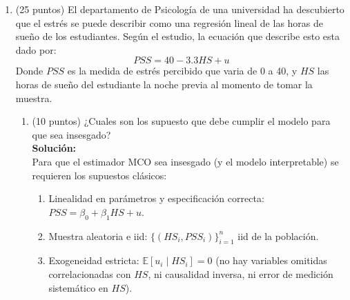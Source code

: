 \documentclass[10pt,a4paper]{article}
\begin{document}
\begin{enumerate}
\begin{enumerate}
    \item (10 puntos) Demuestre que este efecto de atenuación \textbf{no} proviene del error de medición en $Y$.
    \\
    \textbf{Solución}: Tenemos 2 formas, la primera es ver que el efecto de atenuación solo depende de $\sigma_w^2$ y no de $\sigma^2_u$ que es la varianza del error de medición de $Y$.
    La segunda forma es demostrar que solo con error de medición en $X$ se llega al mismo resultado, por lo que el error de medición en $Y$ es indiferente para el valor del estimador. Para esto:
    $$\beta^*_1 = \frac{Cov(Y,X^*)}{Var(X^*)} = \frac{Cov(Y,X+w)}{Var(X+w)}=\frac{Cov(Y,X)+Cov(Y,w)}{Var(X+w)}$$
    Como  $Cov(Y,w)=0$, entonces:
    $$\beta^*_1=\frac{Cov(X,Y)}{Var(X+w)}$$
    Ahora sustituyendo $Y= \beta_0 + \beta_1 \, X +\epsilon$ tenemos:
    $$\beta^*_1=\frac{Cov(X,\beta_0 + \beta_1 \, X+\epsilon)}{Var(X+w)}$$
    distribuyendo, y eliminando covarianzas que son igual a 0:
    $$\beta^*_1=\beta_1\frac{Cov(X,X)}{Var(X+w)}$$
    $$\beta^*_1=\beta_1\frac{Var(X)}{Var(X) + \sigma^2_w}$$
    Como se llega al mismo valor con error de medición en $Y$ y $X$, que con solo $X$ con error de medición, esto indica que el error en Y no afecta a la atenuación y el sesgo.
\end{enumerate}




\item (25 puntos) El departamento de Psicología de una universidad ha descubierto que el estrés se puede describir como una regresión lineal de las horas de sueño de los estudiantes. Según el estudio, la ecuación que describe esto esta dado por:
$$PSS=40 - 3.3HS + u$$
Donde $PSS$ es la medida de estrés percibido que varia de 0 a 40, y $HS$ las horas de sueño del estudiante la noche previa al momento de tomar la muestra. 

\begin{enumerate}
    \item (10 puntos) ¿Cuales son los supuesto que debe cumplir el modelo para que sea insesgado?
        \\
        \textbf{Solución:}\\
        Para que el estimador MCO sea insesgado (y el modelo interpretable) se requieren los supuestos clásicos:
\begin{enumerate}
\item Linealidad en parámetros y especificación correcta: $PSS=\beta_0+\beta_1 HS + u$.
\item Muestra aleatoria e iid: $\{(HS_i,PSS_i)\}_{i=1}^n$ iid de la población.
\item Exogeneidad estricta: $\mathbb E[u_i\mid HS_i]=0$ (no hay variables omitidas correlacionadas con $HS$, ni causalidad inversa, ni error de medición sistemático en $HS$).


\end{enumerate}
\end{enumerate}
\end{enumerate}
\end{document}
